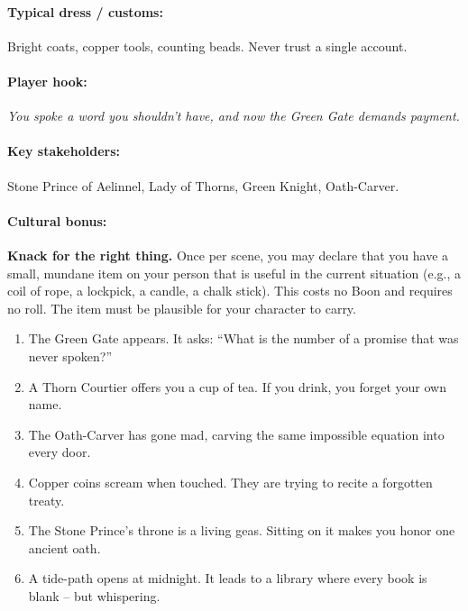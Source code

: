 \paragraph{Typical dress / customs:} Bright coats, copper tools, counting beads. Never trust a single account.

\paragraph{Player hook:} \emph{You spoke a word you shouldn't have, and now the Green Gate demands payment.}

\paragraph{Key stakeholders:} Stone Prince of Aelinnel, Lady of Thorns, Green Knight, Oath-Carver.

\paragraph{Cultural bonus:} \textbf{Knack for the right thing.} Once per scene, you may declare that you have a small, mundane item on your person that is useful in the current situation (e.g., a coil of rope, a lockpick, a candle, a chalk stick). This costs no Boon and requires no roll. The item must be plausible for your character to carry.

\begin{tcolorbox}[colback=gray!5!white, colframe=gray!70!black, title=Aelinnel Mini-Generator (d6),breakable]
\begin{enumerate}
\item The Green Gate appears. It asks: ``What is the number of a promise that was never spoken?''
\item A Thorn Courtier offers you a cup of tea. If you drink, you forget your own name.
\item The Oath-Carver has gone mad, carving the same impossible equation into every door.
\item Copper coins scream when touched. They are trying to recite a forgotten treaty.
\item The Stone Prince's throne is a living geas. Sitting on it makes you honor one ancient oath.
\item A tide-path opens at midnight. It leads to a library where every book is blank -- but whispering.
\end{enumerate}
\end{tcolorbox}

